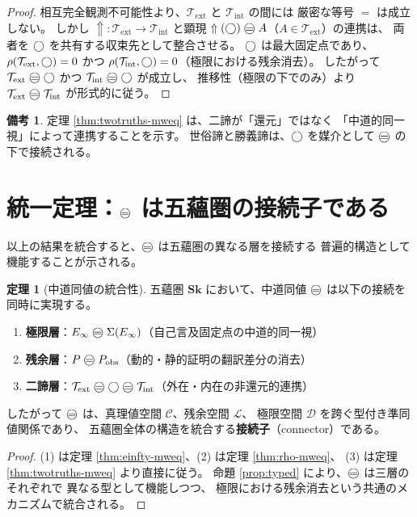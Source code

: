 \documentclass[11pt,a4paper]{article}
\theoremstyle{definition}
\newtheorem{theorem}{定理}[section]
\newtheorem{remark}{備考}[section]
\newcommand{\Sk}{\mathbf{Sk}}
\newcommand{\C}{\mathcal{C}}
\newcommand{\Lspace}{\mathcal{L}}
\newcommand{\Dspace}{\mathcal{D}}
\newcommand{\T}{\mathcal{T}}
\newcommand{\TExt}{\T_{\mathrm{ext}}}
\newcommand{\TInt}{\T_{\mathrm{int}}}
\newcommand{\SelfRef}{\Sigma}
\newcommand{\Einfty}{E_{\infty}}
\begin{document}
\begin{proof}
相互完全観測不可能性より、$\TExt$ と $\TInt$ の間には
厳密な等号 $=$ は成立しない。
しかし $\Uparrow:\TExt\to\TInt$ と顕現
$\Uparrow(\dfix)\mweq A$（$A\in\TExt$）の連携は、
両者を $\bigcirc$ を共有する収束先として整合させる。
$\bigcirc$ は最大固定点であり、
$\rho(\TExt,\dfix)=0$ かつ $\rho(\TInt,\dfix)=0$（極限における残余消去）。
したがって $\TExt\mweq\dfix$ かつ $\TInt\mweq\dfix$ が成立し、
推移性（極限の下でのみ）より $\TExt\mweq\TInt$ が形式的に従う。
\end{proof}

\begin{remark}
定理 \ref{thm:twotruths-mweq} は、二諦が「還元」ではなく
「中道的同一視」によって連携することを示す。
世俗諦と勝義諦は、$\bigcirc$ を媒介として $\mweq$ の下で接続される。
\end{remark}

\section{統一定理：\texorpdfstring{$\mweq$}{mw-equivalence} は五蘊圏の接続子である}

以上の結果を統合すると、$\mweq$ は五蘊圏の異なる層を接続する
普遍的構造として機能することが示される。

\begin{theorem}[中道同値の統合性]\label{thm:unification}
五蘊圏 $\Sk$ において、中道同値 $\mweq$ は以下の接続を同時に実現する。
\begin{enumerate}[label=(\arabic*)]
  \item \textbf{極限層}：$\Einfty \mweq \SelfRef(\Einfty)$（自己言及固定点の中道的同一視）
  \item \textbf{残余層}：$P \mweq P_{\mathrm{obs}}$（動的・静的証明の翻訳差分の消去）
  \item \textbf{二諦層}：$\TExt \mweq \dfix \mweq \TInt$（外在・内在の非還元的連携）
\end{enumerate}
したがって $\mweq$ は、真理値空間 $\C$、残余空間 $\Lspace$、
極限空間 $\Dspace$ を跨ぐ型付き準同値関係であり、
五蘊圏全体の構造を統合する\textbf{接続子}（connector）である。
\end{theorem}

\begin{proof}
(1) は定理 \ref{thm:einfty-mweq}、(2) は定理 \ref{thm:rho-mweq}、
(3) は定理 \ref{thm:twotruths-mweq} より直接に従う。
命題 \ref{prop:typed} により、$\mweq$ は三層のそれぞれで
異なる型として機能しつつ、
極限における残余消去という共通のメカニズムで統合される。
\end{proof}
\end{document}
